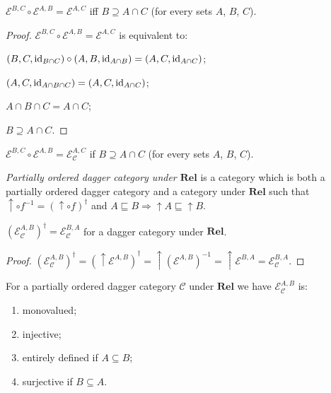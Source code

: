 \begin{prop}
  $\mathcal{E}^{B,C} \circ \mathcal{E}^{A,B} = \mathcal{E}^{A,C}$
  iff $B \supseteq A \cap C$ (for every sets $A$, $B$, $C$).
\end{prop}

\begin{proof}
  $\mathcal{E}^{B,C} \circ \mathcal{E}^{A,B} = \mathcal{E}^{A,C}$
  is equivalent to:
  
  $(B , C , \operatorname{id}_{B \cap C}) \circ (A , B , \operatorname{id}_{A \cap B}) = (A ,
  C , \operatorname{id}_{A \cap C})$;
  
  $(A , C , \operatorname{id}_{A \cap B \cap C}) = (A , C , \operatorname{id}_{A \cap C})$;
  
  $A \cap B \cap C = A \cap C$;
  
  $B \supseteq A \cap C$.
\end{proof}

\begin{cor}
  $\mathcal{E}^{B,C} \circ \mathcal{E}^{A,B} = \mathcal{E}_{\mathcal{C}}^{A,C}$ if
  $B \supseteq A \cap C$ (for every sets $A$, $B$, $C$).
\end{cor}

\begin{defn}
  \emph{Partially ordered dagger category under $\mathbf{Rel}$} is
  a category which is both a partially ordered dagger category and a category
  under $\mathbf{Rel}$ such that $\uparrow \circ f^{- 1} = (\uparrow
  \circ f)^{\dagger}$ and $A \sqsubseteq B \Rightarrow \uparrow A \sqsubseteq
  \uparrow B$.
\end{defn}

\begin{prop}
  $(\mathcal{E}_{\mathcal{C}}^{A,B})^{\dagger} = \mathcal{E}_{\mathcal{C}}^{B,A}$ for a dagger category under
  $\mathbf{Rel}$.
\end{prop}

\begin{proof}
  $(\mathcal{E}_{\mathcal{C}}^{A,B})^{\dagger} = (\uparrow \mathcal{E}^{A,B})^{\dagger} = \uparrow (\mathcal{E}^{A,B})^{- 1} =
  \uparrow \mathcal{E}^{B,A} = \mathcal{E}_{\mathcal{C}}^{B,A}$.
\end{proof}

\begin{prop}
  For a partially ordered dagger category $\mathcal{C}$ under
  $\mathbf{Rel}$ we have $\mathcal{E}_{\mathcal{C}}^{A,B}$ is:
  \begin{enumerate}
    \item monovalued;
    
    \item injective;
    
    \item entirely defined if $A \subseteq B$;
    
    \item surjective if $B \subseteq A$.
  \end{enumerate}
\end{prop}

